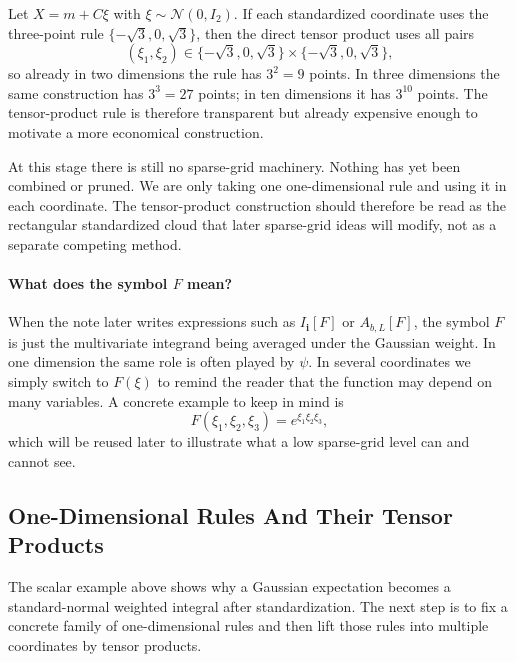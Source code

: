 \documentclass[11pt]{article}
\numberwithin{equation}{section}
\newcommand{\N}{\mathcal N}
\begin{document}
Let \(X=m+C\xi\) with \(\xi\sim\N(0,I_2)\).  If each standardized coordinate
uses the three-point rule \(\{-\sqrt3,0,\sqrt3\}\), then the direct tensor
product uses all pairs
\begin{equation}
  (\xi_1,\xi_2)
  \in
  \{-\sqrt3,0,\sqrt3\}\times\{-\sqrt3,0,\sqrt3\},
  \label{eq:p34-2d-tensor-points}
\end{equation}
so already in two dimensions the rule has \(3^2=9\) points.  In three
dimensions the same construction has \(3^3=27\) points; in ten dimensions it has
\(3^{10}\) points.  The tensor-product rule is therefore transparent but already
expensive enough to motivate a more economical construction.

At this stage there is still no sparse-grid machinery.  Nothing has yet been
combined or pruned.  We are only taking one one-dimensional rule and using it in
each coordinate.  The tensor-product construction should therefore be read as the
rectangular standardized cloud that later sparse-grid ideas will modify, not as a
separate competing method.

\paragraph{What does the symbol \texorpdfstring{$F$}{F} mean?}
When the note later writes expressions such as \(I_{\mathbf i}[F]\) or
\(A_{b,L}[F]\), the symbol \(F\) is just the multivariate integrand being
averaged under the Gaussian weight.  In one dimension the same role is often
played by \(\psi\).  In several coordinates we simply switch to \(F(\xi)\) to
remind the reader that the function may depend on many variables.  A concrete
example to keep in mind is
\[
  F(\xi_1,\xi_2,\xi_3)=e^{\xi_1\xi_2\xi_3},
\]
which will be reused later to illustrate what a low sparse-grid level can and
cannot see.

\subsection{One-Dimensional Rules And Their Tensor Products}
\label{sec:p31-ghq}

The scalar example above shows why a Gaussian expectation becomes a
standard-normal weighted integral after standardization.  The next step is to fix
a concrete family of one-dimensional rules and then lift those rules into
multiple coordinates by tensor products.
\end{document}
